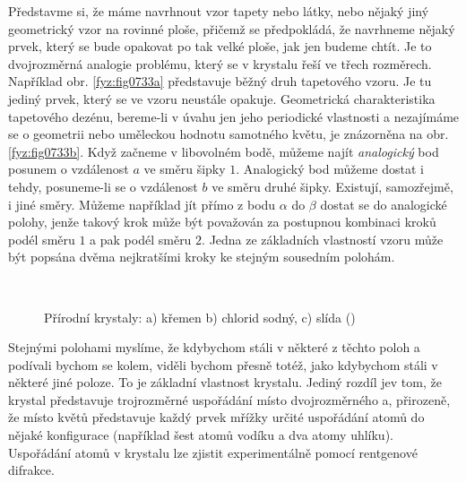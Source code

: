     Představme si, že máme navrhnout vzor tapety nebo látky, nebo nějaký jiný geometrický vzor na 
    rovinné ploše, přičemž se předpokládá, že navrhneme nějaký prvek, který se bude opakovat po tak 
    velké ploše, jak jen budeme chtít. Je to dvojrozměrná analogie problému, který se v krystalu 
    řeší ve třech rozměrech. Například obr. \ref{fyz:fig0733a} představuje běžný druh tapetového 
    vzoru. Je tu jediný prvek, který se ve vzoru neustále opakuje. Geometrická charakteristika 
    tapetového dezénu, bereme-li v úvahu jen jeho periodické vlastnosti a nezajímáme se o geometrii 
    nebo uměleckou hodnotu samotného květu, je znázorněna na obr. \ref{fyz:fig0733b}. Když začneme v 
    libovolném bodě, můžeme najít \emph{analogický} bod posunem o vzdálenost \(a\) ve směru šipky 
    \(1\). Analogický bod můžeme dostat i tehdy, posuneme-li se o vzdálenost \(b\) ve směru druhé 
    šipky. Existují, samozřejmě, i jiné směry. Můžeme například jít přímo z bodu \(\alpha\) do 
    \(\beta\)  dostat se do analogické polohy, jenže takový krok může být považován za postupnou 
    kombinaci kroků podél směru \(1\) a pak podél směru \(2\). Jedna ze základních vlastností vzoru 
    může být popsána dvěma nejkratšími kroky ke stejným sousedním polohám.
    
    \begin{figure}[ht!]
      \centering
                    \\
      \caption{Přírodní krystaly: a) křemen b) chlorid sodný, c) slída
               (\cite[s.~545]{Feynman02})}
    \end{figure}

    Stejnými polohami myslíme, že kdybychom stáli v některé z těchto poloh a podívali bychom se 
    kolem, viděli bychom přesně totéž, jako kdybychom stáli v některé jiné poloze. To je základní 
    vlastnost krystalu. Jediný rozdíl jev tom, že krystal představuje trojrozměrné uspořádání místo 
    dvojrozměrného a, přirozeně, že místo květů představuje každý prvek mřížky určité uspořádání 
    atomů do nějaké konfigurace (například šest atomů vodíku a dva atomy uhlíku). Uspořádání atomů 
    v krystalu lze zjistit experimentálně pomocí rentgenové difrakce. 
    
